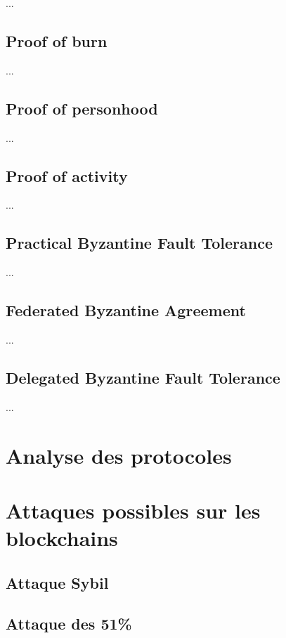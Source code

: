 ...

\subsection{Proof of burn}

...

\subsection{Proof of personhood}

...

\subsection{Proof of activity}

...

\subsection{Practical Byzantine Fault Tolerance}

...

\subsection{Federated Byzantine Agreement}

...

\subsection{Delegated Byzantine Fault Tolerance}

...

\section{Analyse des protocoles}

\section{Attaques possibles sur les blockchains}

\subsection{Attaque Sybil}
\subsection{Attaque des 51\%}
